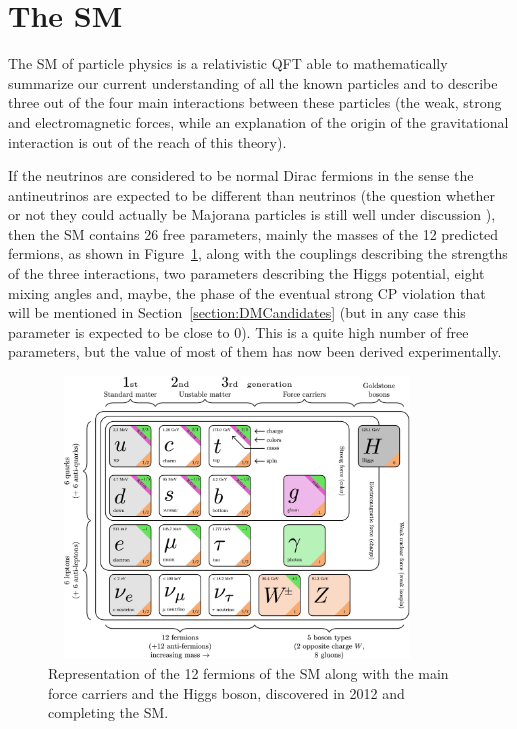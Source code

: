 \documentclass[a4paper, 10pt, openright]{report}
\begin{document}
\section{The \acf{SM}} \label{section:SM}

The \ac{SM} of particle physics is a relativistic \ac{QFT} able to  mathematically summarize our current understanding of all the known particles and to describe three out of the four main interactions between these particles (the weak, strong and electromagnetic forces, while an explanation of the origin of the gravitational interaction is out of the reach of this theory). 

If the neutrinos are considered to be normal Dirac fermions in the sense the antineutrinos are expected to be different than neutrinos (the question whether or not they could actually be Majorana particles is still well under discussion \cite{Majorana}), then the \ac{SM} contains 26 free parameters, mainly the masses of the 12 predicted fermions, as shown in Figure~\ref{figure:SMFermions}, along with the couplings describing the strengths of the three interactions, two parameters describing the Higgs potential, eight mixing angles and, maybe, the phase of the eventual strong CP violation that will be mentioned in Section~\ref{section:DMCandidates} (but in any case this parameter is expected to be close to 0). This is a quite high number of free parameters, but the value of most of them has now been derived experimentally.

\begin{figure}[htbp]
\begin{center}
\includegraphics[width=10cm, height=7.5cm]{figs/SMFermions.png}
\caption{Representation of the 12 fermions of the \ac{SM} \cite{SMFermions} along with the main force carriers and the Higgs boson, discovered in 2012 and completing the \ac{SM}.}
\label{figure:SMFermions}
\end{center}
\end{figure}
\end{document}
